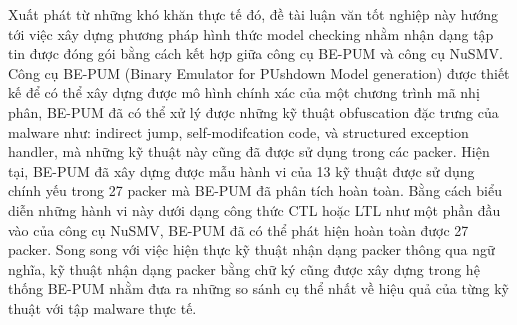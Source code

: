 \hspace{0.5cm}Xuất phát từ những khó khăn thực tế đó, đề tài luận văn tốt nghiệp này hướng tới việc xây dựng phương pháp hình thức model checking nhằm nhận dạng tập tin được đóng gói bằng cách kết hợp giữa công cụ BE-PUM và công cụ NuSMV. Công cụ BE-PUM (Binary Emulator for PUshdown Model generation) được thiết kế để có thể xây dựng được mô hình chính xác của một chương trình mã nhị phân, BE-PUM đã có thể xử lý được những kỹ thuật obfuscation đặc trưng của malware như: indirect jump, self-modifcation code, và structured exception handler, mà những kỹ thuật này cũng đã được sử dụng trong các packer. Hiện tại, BE-PUM đã xây dựng được mẫu hành vi của 13 kỹ thuật được sử dụng chính yếu trong 27 packer mà BE-PUM đã phân tích hoàn toàn. Bằng cách biểu diễn những hành vi này dưới dạng công thức CTL hoặc LTL như một phần đầu vào của công cụ NuSMV, BE-PUM đã có thể phát hiện hoàn toàn được 27 packer. Song song với việc hiện thực kỹ thuật nhận dạng packer thông qua ngữ nghĩa, kỹ thuật nhận dạng packer bằng chữ ký cũng được xây dựng trong hệ thống BE-PUM nhằm đưa ra những so sánh cụ thể nhất về hiệu quả của từng kỹ thuật với tập malware thực tế.\\

